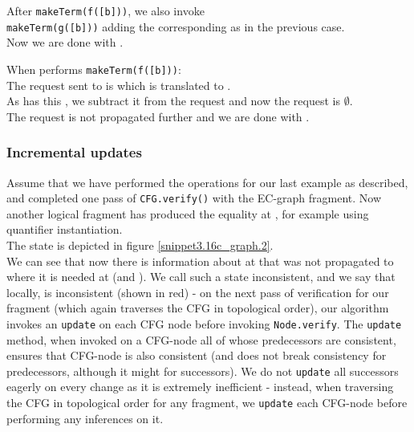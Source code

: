 \bigskip
\noindent
After \lstinline|makeTerm(f([b]))|, we also invoke\\
\lstinline|makeTerm(g([b]))| adding the corresponding \GFAs{} as in the previous case.\\
Now we are done with .

\bigskip
\noindent
When  performs \lstinline|makeTerm(f([b]))|:\\
The request sent to  is  which is translated to .\\
As  has this \RGFA{}, we subtract it from the request and now the request is $\emptyset$.\\
The request is not propagated further and we are done with .


\bigskip
\noindent
\subsubsection*{Incremental updates}
Assume that we have performed the operations for our last example as described, and completed one pass of \lstinline|CFG.verify()| with the EC-graph fragment.
Now another logical fragment has produced the equality  at , for example using quantifier instantiation.\\
The state is depicted in figure \ref{snippet3.16c_graph.2}.\\
We can see that now there is information about  at  that was not propagated to where it is needed at  (and ).
We call such a state inconsistent, and we say that locally,  is inconsistent (shown in red) - on the next pass of verification for our fragment (which again traverses the CFG in topological order), our algorithm invokes an \lstinline|update| on each CFG node before invoking \lstinline|Node.verify|. 
The \lstinline|update| method, when invoked on a CFG-node all of whose predecessors are consistent, ensures that CFG-node is also consistent (and does not break consistency for predecessors, although it might for successors). We do not \lstinline|update| all successors eagerly on every change as it is extremely inefficient - instead, when traversing the CFG in topological order for any fragment, we \lstinline|update| each CFG-node before performing any inferences on it.

